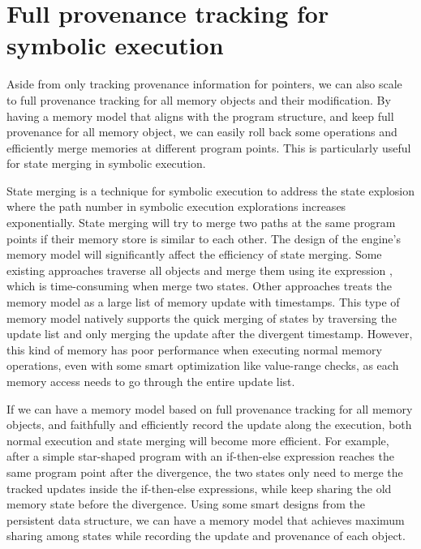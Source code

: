 \documentclass[sigplan, nonacm]{acmart}\settopmatter{printfolios=true,printccs=false,printacmref=false}
\begin{document}
\section{Full provenance tracking for symbolic execution}\label{fullprovenance}
Aside from only tracking provenance information for pointers, we can also scale to full provenance tracking for all memory objects and their modification. By having a memory model that aligns with the program structure, and keep full provenance for all memory object, we can easily roll back some operations and efficiently merge memories at different program points. This is particularly useful for state merging in symbolic execution.\par
State merging is a technique for symbolic execution to address the state explosion where the path number in symbolic execution explorations increases exponentially. State merging will try to merge two paths at the same program points if their memory store is similar to each other. The design of the engine's memory model will significantly affect the efficiency of state merging. Some existing approaches traverse all objects and merge them using ite expression \cite{kuznetsov2012efficient}, which is time-consuming when merge two states. Other approaches \cite{coppa2017rethinking} treats the memory model as a large list of memory update with timestamps. This type of memory model natively supports the quick merging of states by traversing the update list and only merging the update after the divergent timestamp. However, this kind of memory has poor performance when executing normal memory operations, even with some smart optimization like value-range checks, as each memory access needs to go through the entire update list.\par
If we can have a memory model based on full provenance tracking for all memory objects, and faithfully and efficiently record the update along the execution, both normal execution and state merging will become more efficient. For example, after a simple star-shaped program with an if-then-else expression reaches the same program point after the divergence, the two states only need to merge the tracked updates inside the if-then-else expressions, while keep sharing the old memory state before the divergence. Using some smart designs from the persistent data structure, we can have a memory model that achieves maximum sharing among states while recording the update and provenance of each object. %
\end{document}
